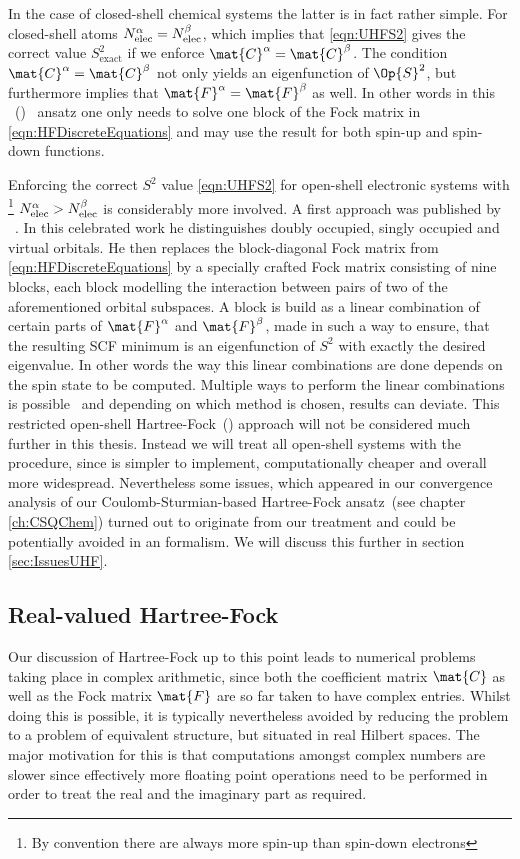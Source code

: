 In the case of closed-shell chemical systems the latter is in fact rather simple.
For closed-shell atoms $N_\text{elec}^\alpha = N_\text{elec}^\beta$,
which implies that \eqref{eqn:UHFS2}
gives the correct value $S^2_\text{exact}$ if we enforce $\mat{C}^\alpha = \mat{C}^\beta$.
The condition $\mat{C}^\alpha = \mat{C}^\beta$ not only yields
an eigenfunction of  $\Op{S}^2$,
but furthermore implies that $\mat{F}^\alpha = \mat{F}^\beta$ as well.
In other words in this
~(\RHF)~\cite{Roothaan1951}
ansatz one only needs to solve one block of the Fock matrix
in \eqref{eqn:HFDiscreteEquations} and may use the result for both
spin-up and spin-down functions.

Enforcing the correct $S^2$ value \eqref{eqn:UHFS2}
for open-shell electronic systems
with%
\footnote{By convention there are always more spin-up than spin-down electrons}
$N_\text{elec}^\alpha > N_\text{elec}^\beta$
is considerably more involved.
A first approach was published by \citeauthor{Roothaan1960}
~\cite{Roothaan1960,Alder1963}.
In this celebrated work he
distinguishes doubly occupied, singly occupied and virtual orbitals.
He then replaces the
block-diagonal Fock matrix from \eqref{eqn:HFDiscreteEquations}
by a specially crafted Fock matrix
consisting of nine blocks,
each block modelling the interaction between pairs of two
of the aforementioned orbital subspaces.
A block is build as a linear combination
of certain parts of $\mat{F}^\alpha$ and $\mat{F}^\beta$,
made in such a way to ensure,
that the resulting SCF minimum is an eigenfunction of $S^2$
with exactly the desired eigenvalue.
In other words the way this linear combinations are done
depends on the spin state to be computed.
Multiple ways to perform the linear combinations is possible~\cite{Glaesemann2010}
and depending on which method is chosen, results can deviate.
This restricted open-shell Hartree-Fock~(\ROHF) approach
will not be considered much further in this thesis.
Instead we will treat all open-shell systems with the \UHF procedure,
since \UHF is simpler to implement, computationally cheaper and overall more widespread.
Nevertheless some issues,
which appeared in our convergence analysis of our
Coulomb-Sturmian-based Hartree-Fock ansatz~(see chapter \ref{ch:CSQChem})
turned out to originate from our \UHF treatment
and could be potentially avoided in an \ROHF formalism.
We will discuss this further in section \vref{sec:IssuesUHF}.

\subsection{Real-valued Hartree-Fock}
Our discussion of Hartree-Fock up to this point
leads to numerical problems taking place in complex arithmetic,
since both the coefficient matrix $\mat{C}$
as well as the Fock matrix $\mat{F}$
are so far taken to have complex entries.
Whilst doing this is possible,
it is typically nevertheless
avoided by reducing
the \HF problem to a problem of equivalent structure,
but situated in real Hilbert spaces.
The major motivation for this is that computations
amongst complex numbers are slower since effectively
more floating point operations need to be performed
in order to treat the real and the imaginary part as required.


